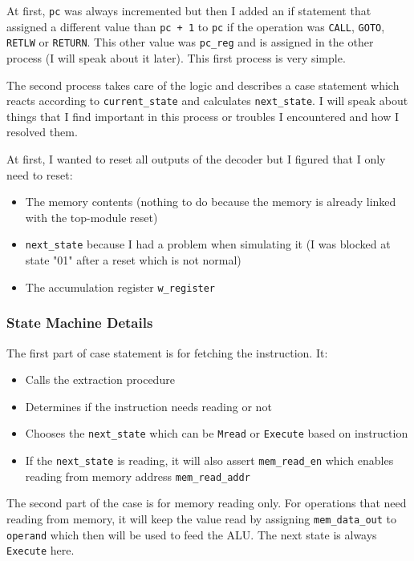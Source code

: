 At first, \texttt{pc} was always incremented but then I added an if statement that assigned a different value than \texttt{pc + 1} to \texttt{pc} if the operation was \texttt{CALL}, \texttt{GOTO}, \texttt{RETLW} or \texttt{RETURN}. This other value was \texttt{pc\_reg} and is assigned in the other process (I will speak about it later). This first process is very simple.

The second process takes care of the logic and describes a case statement which reacts according to \texttt{current\_state} and calculates \texttt{next\_state}. I will speak about things that I find important in this process or troubles I encountered and how I resolved them.

At first, I wanted to reset all outputs of the decoder but I figured that I only need to reset:
\begin{itemize}
    \item The memory contents (nothing to do because the memory is already linked with the top-module reset)
    \item \texttt{next\_state} because I had a problem when simulating it (I was blocked at state "01" after a reset which is not normal)
    \item The accumulation register \texttt{w\_register}
\end{itemize}

\subsubsection{State Machine Details}
The first part of case statement is for fetching the instruction. It:
\begin{itemize}
    \item Calls the extraction procedure
    \item Determines if the instruction needs reading or not
    \item Chooses the \texttt{next\_state} which can be \texttt{Mread} or \texttt{Execute} based on instruction
    \item If the \texttt{next\_state} is reading, it will also assert \texttt{mem\_read\_en} which enables reading from memory address \texttt{mem\_read\_addr}
\end{itemize}

The second part of the case is for memory reading only. For operations that need reading from memory, it will keep the value read by assigning \texttt{mem\_data\_out} to \texttt{operand} which then will be used to feed the ALU. The next state is always \texttt{Execute} here.

